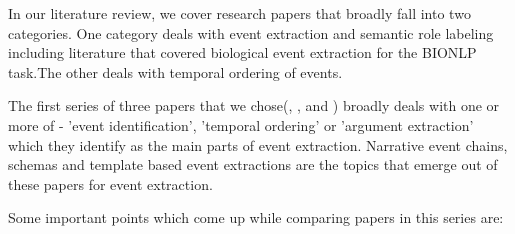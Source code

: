 In our literature review, we cover research papers that broadly fall into two categories. One category deals with event extraction and semantic role labeling including literature that covered biological event extraction for the BIONLP task.The other deals with temporal ordering of events.

The first series of three papers that we chose(\citeauthor{chju2008ec}, \citeauthor{chju2009}, and \citeauthor{chju2011}) broadly deals with one or more of - 'event identification', 'temporal ordering' or 'argument extraction' which they identify as the main parts of event extraction. Narrative event chains, schemas and template based event extractions are the topics that emerge out of these papers for event extraction.

Some important points which come up while comparing papers in this series are:
